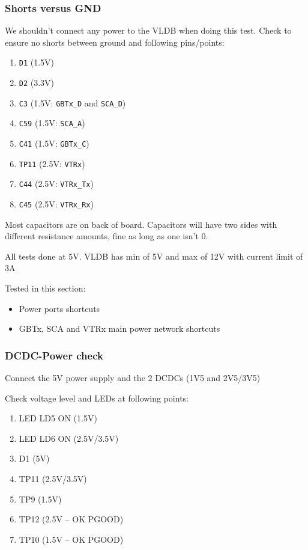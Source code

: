 \subsubsection{Shorts versus GND}

We shouldn't connect any power to the VLDB when doing this test.
Check to ensure no shorts between ground and following pins/points:

\begin{enumerate}
    \item \texttt{D1} (1.5V)
    \item \texttt{D2} (3.3V)
    \item \texttt{C3} (1.5V: \texttt{GBTx\_D} and \texttt{SCA\_D})
    \item \texttt{C59} (1.5V: \texttt{SCA\_A})
    \item \texttt{C41} (1.5V: \texttt{GBTx\_C})
    \item \texttt{TP11} (2.5V: \texttt{VTRx})
    \item \texttt{C44} (2.5V: \texttt{VTRx\_Tx})
    \item \texttt{C45} (2.5V: \texttt{VTRx\_Rx})
\end{enumerate}

\begin{leftbar}
    Most capacitors are on back of board. Capacitors will have two sides with
    different resistance amounts, fine as long as one isn't 0.
\end{leftbar}

\begin{leftbar}
    All tests done at 5V. VLDB has min of 5V and max of 12V with current limit
    of 3A
\end{leftbar}

Tested in this section:
\begin{itemize}
    \item Power ports shortcuts
    \item GBTx, SCA and VTRx main power network shortcuts
\end{itemize}


\subsubsection{DCDC-Power check}

Connect the 5V power supply and the 2 DCDCs (1V5 and 2V5/3V5)

Check voltage level and LEDs at following points:

\begin{enumerate}
    \item LED LD5 ON (1.5V)
    \item LED LD6 ON (2.5V/3.5V)
    \item D1 (5V)
    \item TP11 (2.5V/3.5V)
    \item TP9 (1.5V)
    \item TP12 (2.5V – OK PGOOD)
    \item TP10 (1.5V – OK PGOOD)
\end{enumerate}

